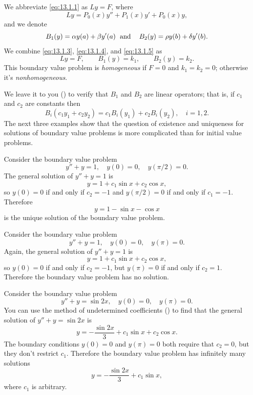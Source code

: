 We abbreviate \eqref{eq:13.1.1} as $Ly=F$, where
\[
Ly=P_{0}(x)y''+P_{1}(x)y'+P_{0}(x)y,
\]
and we denote
\[
B_{1}(y)=\alpha y(a)+\beta y'(a)
\text{\;    and\; \;  }
B_{2}(y)=\rho y(b)+\delta y'(b).
\]
We combine \eqref{eq:13.1.3}, \eqref{eq:13.1.4}, and \eqref{eq:13.1.5} as
\begin{equation} \label{eq:13.1.6}
Ly=F,\qquad B_{1}(y)=k_{1},\qquad B_{2}(y)=k_{2}.
\end{equation}
This boundary value problem is \emph{homogeneous} if $F=0$
and $k_{1}=k_{2}=0$;   otherwise it's
\emph{nonhomogeneous}.

We leave it to you () to verify that $B_{1}$
and $B_{2}$ are linear operators; that is, if $c_{1}$  and $c_{2}$
are constants then
\begin{equation} \label{eq:13.1.7}
B_{i}(c_{1}y_{1}+c_{2}y_{2})=c_{1}B_{i}(y_{1})+c_{2}B_{i}(y_{2}),\quad
i=1,2.
\end{equation}
The next three examples show that the question of existence and uniqueness
for solutions of boundary value problems is more complicated than
for initial value
problems.

\begin{example}\label{example:13.1.1}
Consider the boundary value problem
\[
y''+y=1,\quad y(0)=0, \quad y(\pi/2)=0.
\]
The general solution of $y''+y=1$ is
\[
y=1+c_{1}\sin x+c_{2} \cos x,
\]
so $y(0)=0$ if  and only if $c_{2}=-1$ and $y(\pi/2)=0$
if and only if $c_{1}=-1$. Therefore
\[
 y =1-\sin x -\cos x
\]
is the unique solution of the boundary value problem.
\end{example}

\begin{example}\label{example:13.1.2}
Consider the boundary value problem
\[
y''+y=1,\quad y(0)=0, \quad y(\pi)=0.
\]
Again, the general solution of $y''+y=1$ is
\[
y=1+c_{1}\sin x+c_{2} \cos x,
\]
so $y(0)=0$ if  and only if $c_{2}=-1$, but $y(\pi)=0$ if and only if
$c_{2}=1$. Therefore the boundary value problem has no solution.
\end{example}

\begin{example}\label{example:13.1.3}
Consider the boundary value problem
\[
y''+y=\sin 2x,\quad y(0)=0, \quad y(\pi)=0.
\]
You can use the method of undetermined coefficients
() to find that the general solution of
$y''+y=\sin 2x$  is
\[
y=-\frac{\sin2x}{3}+c_{1}\sin x+c_{2}\cos x.
\]
The boundary conditions $y(0)=0$ and $y(\pi)=0$ both require that
$c_{2}=0$, but they don't restrict $c_{1}$. Therefore the boundary value
problem has infinitely many solutions
\[
y=-\frac{\sin2x}{3}+c_{1}\sin x,
\]
where $c_{1}$  is arbitrary.
\end{example}



